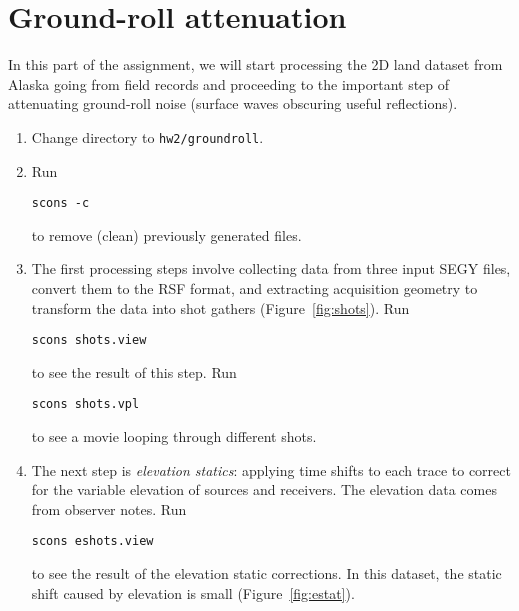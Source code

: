 \section{Ground-roll attenuation}

In this part of the assignment, we will start processing the 2D land
dataset from Alaska going from field records and proceeding to the
important step of attenuating ground-roll noise (surface waves
obscuring useful reflections).

\begin{enumerate}          
\item Change directory to \texttt{hw2/groundroll}.
\item Run
\begin{verbatim}
scons -c
\end{verbatim}
to remove (clean) previously generated files.
\item The first processing steps involve collecting data from three input SEGY files, convert them to the RSF format, and extracting acquisition geometry to transform the data into shot gathers (Figure~\ref{fig:shots}). Run
\begin{verbatim}
scons shots.view
\end{verbatim}
to see the result of this step. Run
\begin{verbatim}
scons shots.vpl
\end{verbatim}
to see a movie looping through different shots.
\item The next step is \emph{elevation statics}: applying time shifts to each trace to correct for the variable elevation of sources and receivers. The elevation data comes from observer notes. Run
\begin{verbatim}
scons eshots.view
\end{verbatim}
to see the result of the elevation static corrections. In this dataset,
the static shift caused by elevation is small (Figure~\ref{fig:estat}).



\end{enumerate}
